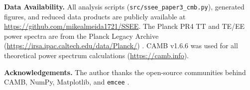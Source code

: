 \documentclass[12pt,a4paper]{article}
\begin{document}
\bigskip
\noindent\textbf{Data Availability.}
All analysis scripts (\texttt{src/ssee\_paper3\_cmb.py}), generated figures,
and reduced data products are publicly available at
\url{https://github.com/mikealmeida1721/SSEE}.
The Planck PR4 TT and TE/EE power spectra are from the Planck Legacy Archive
(\url{https://irsa.ipac.caltech.edu/data/Planck/}) \citep{Planck2020}.
CAMB v1.6.6 was used for all theoretical power spectrum calculations
(\url{https://camb.info}).

\bigskip
\noindent\textbf{Acknowledgements.}
The author thanks the open-source communities behind CAMB, NumPy,
Matplotlib, and \texttt{emcee} \citep{emcee}.

\clearpage


\end{document}
